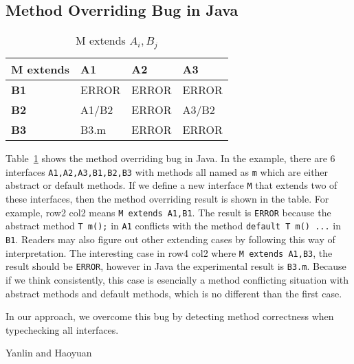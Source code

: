 \subsection{Method Overriding Bug in Java}
\begin{table}[]
\centering
\begin{tabular}{|l|l|l|l|}
\hline
\textbf{M extends} & \textbf{A1}                  & \textbf{A2} & \textbf{A3} \\ \hline
\textbf{B1}        & ERROR                        & ERROR       & ERROR       \\ \hline
\textbf{B2}        & A1/B2                        & ERROR       & A3/B2       \\ \hline
\textbf{B3}        & \cellcolor[HTML]{C0C0C0}B3.m & ERROR       & ERROR       \\ \hline
\end{tabular}
\caption{M extends $A_i, B_j$}
\label{table:javabug}
\end{table}

Table~\ref{table:javabug} shows the method overriding bug in Java. In the
example, there are 6 interfaces \texttt{A1,A2,A3,B1,B2,B3} with methods all
named as \texttt{m} which are either abstract or default methods. If we define a
new interface \texttt{M} that extends two of these interfaces, then the method
overriding result is shown in the table. For example, row2 col2 means \texttt{M
  extends A1,B1}. The result is \texttt{ERROR} because the abstract method
\texttt{T m();} in \texttt{A1} conflicts with the method \texttt{default T m()
  {...}} in \texttt{B1}. Readers may also figure out other extending cases by
following this way of interpretation. The interesting case in row4 col2 where
\texttt{M extends A1,B3}, the result should be \texttt{ERROR}, however in Java
the experimental result is \texttt{B3.m}. Because if we think consistently, this
case is esencially a method conflicting situation with abstract methods and
default methods, which is no different than the first case.


In our approach, we overcome this bug by detecting method correctness when
typechecking all interfaces.


Yanlin and Haoyuan

